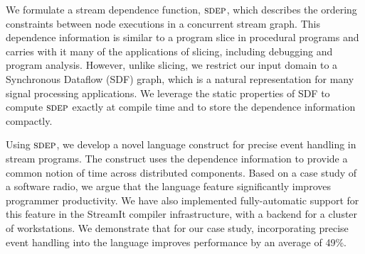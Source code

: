 We formulate a stream dependence function, $\textsc{sdep}$, which describes
the ordering constraints between node executions in a concurrent
stream graph. This dependence information is similar to a program
slice in procedural programs and carries with it many of the
applications of slicing, including debugging and program analysis.
However, unlike slicing, we restrict our input domain to a Synchronous
Dataflow (SDF) graph, which is a natural representation for many
signal processing applications.  We leverage the static properties of
SDF to compute $\textsc{sdep}$ exactly at compile time and to store the
dependence information compactly.

Using $\textsc{sdep}$, we develop a novel language construct for precise event
handling in stream programs.  The construct uses the dependence
information to provide a common notion of time across distributed
components.  Based on a case study of a software radio, we argue that
the language feature significantly improves programmer
productivity. We have also implemented fully-automatic support for
this feature in the StreamIt compiler infrastructure, with a backend
for a cluster of workstations.  We demonstrate that for our case
study, incorporating precise event handling into the language improves
performance by an average of 49\%.

